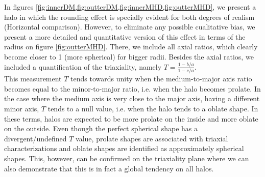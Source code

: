 In figures \ref{fig:innerDM,fig:outterDM,fig:innerMHD,fig:outterMHD}, we present a halo in which the rounding effect is specially evident for both degrees of realism (Horizontal comparison). However, to eliminate any possible cualitative bias, we present a more detailed and quantitative version of this effect in terms of the radius on figure \ref{fig:outterMHD}. There, we include all axial ratios, which clearly become closer to 1 (more spherical) for bigger radii. Besides the axial ratios, we included a quantification of the triaxiality, namely $T=\frac{1-b/a}{1-c/a}$.\\

 This measurement $T$ tends towards unity when the medium-to-major axis ratio becomes equal to the minor-to-major ratio, i.e. when the halo becomes prolate. In the case where the medium axis is very close to the major axis, having a different minor axis, $T$ tends to a null value, i.e. when the halo tends to a oblate shape. In these terms, halos are expected to be more prolate on the inside and more oblate on the outside. Even though the perfect spherical shape has a divergent/undefined $T$ value, prolate shapes are associated with triaxial characterizations and oblate shapes are identified as approximately spherical shapes. This, however, can be confirmed on the triaxiality plane where we can also demonstrate that this is in fact a global tendency on all halos.\\


